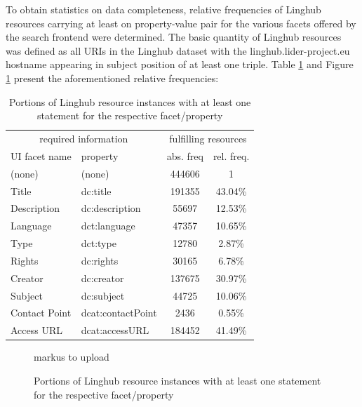 \documentclass[smallextended]{svjour3}       %
\begin{document}
To obtain statistics on data completeness, relative frequencies of Linghub
resources carrying at least on property-value pair for the various facets
offered by the search frontend were determined. The basic quantity of Linghub
resources was defined as all URIs in the Linghub dataset with the
linghub.lider-project.eu hostname appearing in subject position of at least one
triple. Table \ref{tab:reqinfo} and Figure
\ref{fig:reqinfo} present the aforementioned relative frequencies:


\begin{table}
    \begin{tabular}{ll|cc}
    \multicolumn{2}{c|}{required information} & \multicolumn{2}{c}{fulfilling resources} \\
    UI facet name & property          & abs. freq & rel. freq. \\
    \hline
    (none)        & (none)            & 444606    & 1          \\
    Title         & dc:title          & 191355    & 43.04\%    \\
    Description   & dc:description    & 55697     & 12.53\%    \\
    Language      & dct:language      & 47357     & 10.65\%    \\
    Type          & dct:type          & 12780     &  2.87\%    \\
    Rights        & dc:rights         & 30165     &  6.78\%    \\
    Creator       & dc:creator        & 137675    & 30.97\%    \\
    Subject       & dc:subject        & 44725     & 10.06\%    \\
    Contact Point & dcat:contactPoint & 2436      &  0.55\%    \\
    Access URL    & dcat:accessURL    & 184452    & 41.49\%    \\
    \end{tabular}
    \caption{\label{tab:reqinfo} Portions of Linghub resource instances with at
least one statement for the respective facet/property}
\end{table}

\begin{figure}
        markus to upload
    \caption{\label{fig:reqinfo} Portions of Linghub resource instances with at
least one statement for the respective facet/property}
\end{figure}
 
\end{document}
